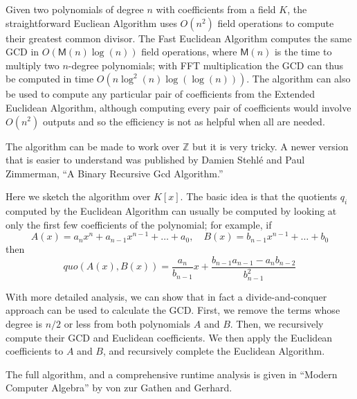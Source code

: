 \documentclass[12pt]{article}
\begin{document}
Given two polynomials of degree $n$ with coefficients from a field $K$, the straightforward Eucliean Algorithm uses $O(n^2)$ field operations to compute their greatest common divisor. The Fast Euclidean Algorithm computes the same GCD in $O(\mathsf{M}(n) \log(n))$ field operations, where $\mathsf{M}(n)$ is the time to multiply two $n$-degree polynomials; with FFT multiplication the GCD can thus be computed in time $O(n \log^2(n) \log(\log(n)))$. The algorithm can also be used to compute any particular pair of coefficients from the Extended Euclidean Algorithm, although computing every pair of coefficients would involve $O(n^2)$ outputs and so the efficiency is not as helpful when all are needed.

The algorithm can be made to work over $\mathbb{Z}$ but it is very tricky. A newer version that is easier to understand was published by Damien Stehl\'e and Paul Zimmerman, ``A Binary Recursive Gcd Algorithm.''

Here we sketch the algorithm over $K[x]$. The basic idea is that the quotients $q_i$ computed by the Euclidean Algorithm can usually be computed by looking at only the first few coefficients of the polynomial; for example, if
$$A(x) = a_nx^n + a_{n-1}x^{n-1} + \ldots +a_0, \quad B(x) = b_{n-1}x^{n-1} + \ldots +b_0$$
then
$$quo(A(x), B(x)) =  \frac{a_n}{b_{n-1}}x+\frac{b_{n-1}a_{n-1}-a_nb_{n-2}}{b_{n-1}^2}$$

With more detailed analysis, we can show that in fact a divide-and-conquer approach can be used to calculate the GCD. First, we remove the terms whose degree is $n/2$ or less from both polynomials $A$ and $B$. Then, we recursively compute their GCD and Euclidean coefficients. We then apply the Euclidean coefficients to $A$ and $B$, and recursively complete the Euclidean Algorithm. 

The full algorithm, and a comprehensive runtime analysis is given in ``Modern Computer Algebra'' by von zur Gathen and Gerhard.
\end{document}
